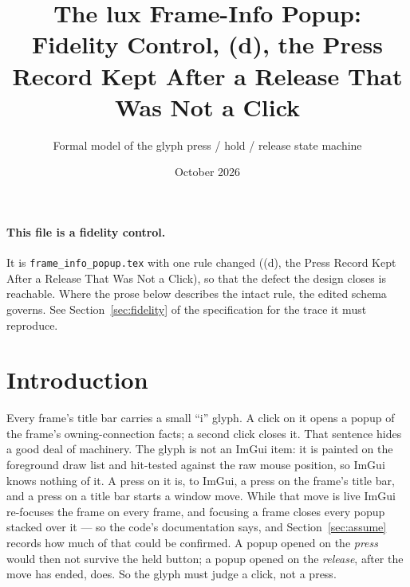 \documentclass[a4paper,10pt,fleqn]{article}
\begin{document}
\title{The lux Frame-Info Popup: Fidelity Control, (d), the Press Record Kept After a Release That Was Not a Click}
\author{Formal model of the glyph press / hold / release state machine}
\date{October 2026}
\maketitle

\paragraph{This file is a fidelity control.}
It is \texttt{frame\_info\_popup.tex} with one rule changed ((d), the Press Record Kept After a Release That Was Not a Click), so that
the defect the design closes is reachable.  Where the prose below describes
the intact rule, the edited schema governs.  See Section~\ref{sec:fidelity} of
the specification for the trace it must reproduce.

\section{Introduction}

Every frame's title bar carries a small ``i'' glyph.  A click on it opens a
popup of the frame's owning-connection facts; a second click closes it.  That
sentence hides a good deal of machinery.  The glyph is not an ImGui item: it is
painted on the foreground draw list and hit-tested against the raw mouse
position, so ImGui knows nothing of it.  A press on it is, to ImGui, a press on
the frame's title bar, and a press on a title bar starts a window move.  While
that move is live ImGui re-focuses the frame on every frame, and focusing a
frame closes every popup stacked over it --- so the code's documentation says,
and Section~\ref{sec:assume} records how much of that could be confirmed.  A
popup opened on the \emph{press} would then not survive the held button; a
popup opened on the \emph{release}, after the move has ended, does.  So the glyph
must judge a click, not a press.
\end{document}
